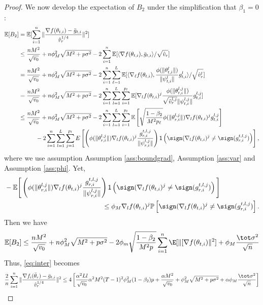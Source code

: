 \documentclass[nohyperref]{article}
\theoremstyle{plain}
\theoremstyle{definition}
\theoremstyle{remark}
\begin{document}
\begin{proof}


We now develop the expectation of $B_2$ under the simplification that $\beta_1 = 0$:
\begin{align}\notag
    \mathbb E[B_2]&=\mathbb E[\sum_{i=1}^n\Vert \frac{\nabla f(\theta_{t,i})-\bar g_{t,i}}{\hat v_r^{1/4}} \Vert^2] \\\notag
    &\leq \frac{nM^2}{\sqrt{v_0}}+n\phi_M^2\sqrt{M^2+p\sigma^2}-2\sum_{i=1}^n\mathbb E[\langle \nabla f(\theta_{t,i}),\bar g_{t,i} \rangle/\sqrt{\hat v_r}]\\\notag
    &=\frac{nM^2}{\sqrt{v_0}}+n\phi_M^2\sqrt{M^2+p\sigma^2}-2\sum_{i=1}^n \sum_{\ell=1}^L \mathbb E[\langle \nabla_\ell f(\theta_{t,i}),\frac{\phi(\|\theta_{t,i}^l \|)}{\| \psi_{t,i}^l \|}g_{t,i}^l \rangle/\sqrt{\hat v_r^l}]\\\notag
    &=\frac{nM^2}{\sqrt{v_0}}+n\phi_M^2\sqrt{M^2+p\sigma^2}-2\sum_{i=1}^n \sum_{l=1}^L\sum_{i=1}^{p_l} \mathbb E[\nabla_l f(\theta_{t,i})^j\frac{\phi(\|\theta_{t,i}^{l,j} \|)}{\sqrt{\hat v_r^{l,j}}\| \psi_{t,i}^{l,j} \|}g_{t,i}^{l,j} ]\\\notag
    & \leq \frac{nM^2}{\sqrt{v_0}}+n\phi_M^2\sqrt{M^2+p\sigma^2}-2\sum_{i=1}^n \sum_{l=1}^L\sum_{i=1}^{p_l} \mathbb E \left[ \sqrt{\frac{1-\beta_2}{M^2 p_\ell}}  \phi(\|\theta_{r,i}^{l,j}\|)  \nabla_l f(\theta_{t,i})^j  g_{t,i}^{l,j}\right]\\\notag
    &\hspace{0.4in} -2 \sum_{i = 1}^n \sum_{l=1}^L\sum_{j=1}^{p_l}  E \left[  \left( \phi(\|\theta_{r,i}^{l,j}\|)   \nabla_l f(\theta_{t,i})^j   \frac{g_{r,i}^{t,l,j}}{ \|\psi_{r,i}^{l,j}\|}\right)\mathsf{1}\left( \sign(  \nabla_l f(\theta_{t,i})^j \neq  \sign( g_{r,i}^{t,l,j}) \right)\right],
\end{align}
where we use assumption Assumption \ref{ass:boundgrad}, Assumption \ref{ass:var} and Assumption \ref{ass:phi}. 
Yet,
\begin{align*}
&- \mathbb E \Bigg[  \left( \phi(\|\theta_{r,i}^{l,j}\|)   \nabla_l f(\theta_{t,i})^j   \frac{g_{r,i}^{t,l,j}}{ \|\psi_{r,i}^{l,j}\|}\right)\mathsf{1}\left( \sign(  \nabla_l f(\theta_{t,i})^j
\neq  \sign( g_{r,i}^{t,l,j}) \right)\Bigg] \\
&\hspace{2in} \leq  \phi_M \nabla_l f(\theta_{t,i})^j   \mathbb{P}\left[  \sign(  \nabla_l f(\theta_{t,i})^j \neq  \sign( g_{r,i}^{t,l,j}) \right].
\end{align*}
Then we have
\begin{align}\notag
    \mathbb E[B_2]\leq  \frac{nM^2}{\sqrt{v_0}}+n\phi_M^2\sqrt{M^2+p\sigma^2}-2 \phi_m \sqrt{\frac{1-\beta_2}{M^2 p}} \sum_{i=1}^n \E[\| [\nabla f(\theta_{t,i}) \|^2] + \phi_M \frac{\tot \sigma^2}{\sqrt{n}}
\end{align}
Thus, \eqref{eq:inter} becomes
\begin{align}\notag
    \frac{2}{n}\sum_{i=1}^n\Vert \frac{\nabla f_i(\bar\theta_r)-\bar g_{t,i}}{\hat v_r^{1/4}} \Vert^2 \leq 4 \left[ \frac{\alpha^2 Ll}{\sqrt{v_0}} \alpha^2 M^2 (T-1)^2 \phi_M^2 (1-\beta_2)p + \frac{\alpha M^2}{\sqrt{v_0}}+\phi_M^2\sqrt{M^2+p\sigma^2} + \alpha\phi_M \frac{\tot \sigma^2}{\sqrt{n}}\right]
\end{align}


\end{proof}
\end{document}
